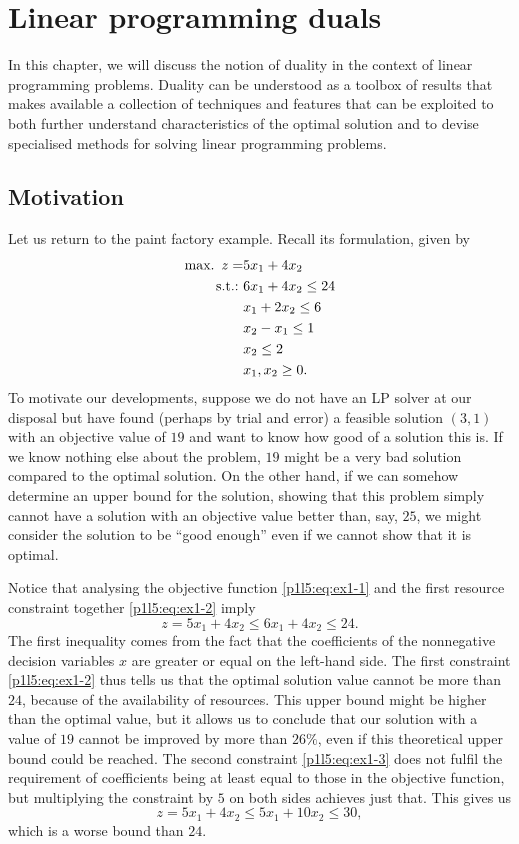 \section{Linear programming duals}

In this chapter, we will discuss the notion of duality in the context of linear programming problems. Duality can be understood as a toolbox of results that makes available a collection of techniques and features that can be exploited to both further understand characteristics of the optimal solution and to devise specialised methods for solving linear programming problems.


\subsection{Motivation}

Let us return to the paint factory example. Recall its formulation, given by
%
\begin{align}
    \mathop{\text{max.~}} z = &5x_1 + 4x_2 \label{p1l5:eq:ex1-1} \\
    \mathop{\text{s.t.:~}} &6x_1 + 4x_2 \leq 24 \label{p1l5:eq:ex1-2} \\
    &x_1 + 2x_2 \leq 6 \label{p1l5:eq:ex1-3} \\
    &x_2 - x_1 \leq 1 \label{p1l5:eq:ex1-4} \\
    &x_2 \leq 2 \label{p1l5:eq:ex1-5} \\
    &x_1, x_2 \geq 0. \label{p1l5:eq:ex1-6}
\end{align}
%
To motivate our developments, suppose we do not have an LP solver at our disposal but have found (perhaps by trial and error) a feasible solution $(3, 1)$ with an objective value of $19$ and want to know how good of a solution this is. If we know nothing else about the problem, $19$ might be a very bad solution compared to the optimal solution. On the other hand, if we can somehow determine an upper bound for the solution, showing that this problem simply cannot have a solution with an objective value better than, say, $25$, we might consider the solution to be ``good enough'' even if we cannot show that it is optimal.

Notice that analysing the objective function \eqref{p1l5:eq:ex1-1} and the first resource constraint together \eqref{p1l5:eq:ex1-2} imply
%
$$
z = 5x_1 + 4x_2 \leq 6x_1 + 4x_2 \leq 24.
$$
%
The first inequality comes from the fact that the coefficients of the nonnegative decision variables $x$ are greater or equal on the left-hand side. The first constraint \eqref{p1l5:eq:ex1-2} thus tells us that the optimal solution value cannot be more than $24$, because of the availability of resources. This upper bound might be higher than the optimal value, but it allows us to conclude that our solution with a value of $19$ cannot be improved by more than $26\%$, even if this theoretical upper bound could be reached. The second constraint \eqref{p1l5:eq:ex1-3} does not fulfil the requirement of coefficients being at least equal to those in the objective function, but multiplying the constraint by $5$ on both sides achieves just that. This gives us
%
$$
z = 5x_1 + 4x_2 \leq 5x_1 + 10x_2 \leq 30,
$$
%
which is a worse bound than $24$.

